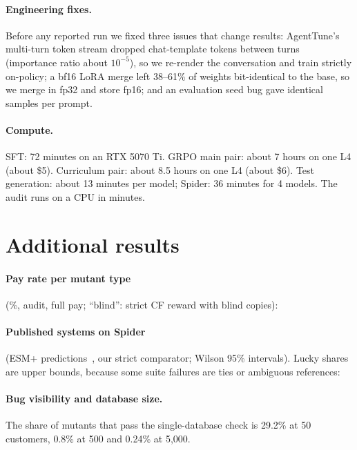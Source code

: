 \documentclass{article}
\begin{document}
\paragraph{Engineering fixes.}
Before any reported run we fixed three issues that change results: AgentTune's multi-turn token stream dropped chat-template tokens between turns (importance ratio about $10^{-5}$), so we re-render the conversation and train strictly on-policy; a bf16 LoRA merge left 38--61\% of weights bit-identical to the base, so we merge in fp32 and store fp16; and an evaluation seed bug gave identical samples per prompt.

\paragraph{Compute.}
SFT: 72 minutes on an RTX 5070 Ti. GRPO main pair: about 7 hours on one L4 (about \$5). Curriculum pair: about 8.5 hours on one L4 (about \$6). Test generation: about 13 minutes per model; Spider: 36 minutes for 4 models. The audit runs on a CPU in minutes.

\section{Additional results}
\label{app:results}

\paragraph{Pay rate per mutant type} (\%, audit, full pay; ``blind'': strict CF reward with blind copies):
\begin{center}\small

\end{center}

\paragraph{Published systems on Spider} (ESM+ predictions~\citep{esmp}, our strict comparator; Wilson 95\% intervals). Lucky shares are upper bounds, because some suite failures are ties or ambiguous references:
\begin{center}\small

\end{center}

\paragraph{Bug visibility and database size.}
The share of mutants that pass the single-database check is 29.2\% at 50 customers, 0.8\% at 500 and 0.24\% at 5,000.
\end{document}
